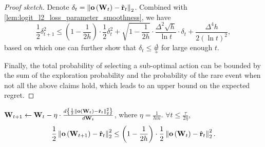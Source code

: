 \begin{proof} [Proof sketch]
		Denote $\delta_t =  \left\| {\mathbf{o}}\left( {\mathbf{W}}_{t} \right) - \hat{{\mathbf{r}}}_{t}\right\|_2$. Combined with \cref{lem:logit_l2_loss_parameter_smoothness}, we have
		\[
		\frac{1}{2}\delta_{t+1}^2 \le \left( 1 - \frac{1}{2 h} \right) \cdot \frac{1}{2} \delta_t^2 + \sqrt{1 - \frac{1}{2 h} } \cdot \frac{\Delta^2 \sqrt{h}}{\ln{t}} \cdot \delta_t + \frac{\Delta^4 h}{2 \left( \ln{t} \right)^2 },
		\]
		based on which one can further show that $\delta_t \le \frac{\Delta}{5}$ for large enough $t$.
		
		Finally, the total probability of selecting a sub-optimal action can be bounded by the sum of the exploration probability and the probability of the rare event when not all the above claims hold, which leads to an upper bound on the expected regret.
		\end{proof}
	\begin{lem}
		\label{lem:logit_l2_loss_parameter_smoothness}
		${\mathbf{W}}_{t+1} \leftarrow {\mathbf{W}}_t - \eta \cdot \frac{d \left\{ \frac{1}{2} \left\| {\mathbf{o}}\left( {\mathbf{W}}_t\right) - \hat{{\mathbf{r}}}_t \right\|_2^2 \right\}}{d {\mathbf{W}}_t}$, where $\eta = \frac{1}{h m}$. $\forall t \le \frac{\tau}{2 \eta}$,
		\begin{equation*}
		\begin{split}
		\frac{1}{2} \left\| {\mathbf{o}}\left( {\mathbf{W}}_{t+1} \right) - \hat{{\mathbf{r}}}_t \right\|_2^2 \le \left( 1 - \frac{1}{2 h} \right) \cdot \frac{1}{2} \left\| {\mathbf{o}}\left( {\mathbf{W}}_t \right) - \hat{{\mathbf{r}}}_t \right\|_2^2.
		\end{split}
		\end{equation*}
	\end{lem}